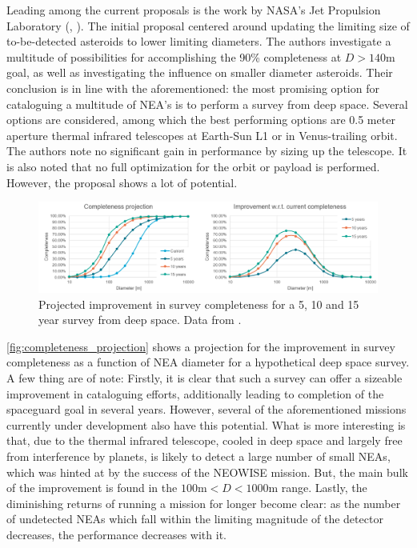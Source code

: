 Leading among the current proposals is the work by NASA's Jet Propulsion Laboratory (\cite{2003NEOSDT}, \cite{2017NEOSDT}). The initial proposal centered around updating the limiting size of to-be-detected asteroids to lower limiting diameters. The authors investigate a multitude of possibilities for accomplishing the 90\% completeness at $D > 140 \mathrm{m}$ goal, as well as investigating the influence on smaller diameter asteroids. Their conclusion is in line with the aforementioned: the most promising option for cataloguing a multitude of NEA's is to perform a survey from deep space. Several options are considered, among which the best performing options are 0.5 meter aperture thermal infrared telescopes at Earth-Sun L1 or in Venus-trailing orbit. The authors note no significant gain in performance by sizing up the telescope. It is also noted that no full optimization for the orbit or payload is performed. However, the proposal shows a lot of potential. \\

\begin{figure}[htbp]
 \centering
 \includegraphics[width=1.0\textwidth]{img/completeness_projection.png}
 \caption{Projected improvement in survey completeness for a 5, 10 and 15 year survey from deep space. Data from \cite{2017NEOSDT}.}
 \label{fig:completeness_projection}
\end{figure}

\autoref{fig:completeness_projection} shows a projection for the improvement in survey completeness as a function of NEA diameter for a hypothetical deep space survey. A few thing are of note: Firstly, it is clear that such a survey can offer a sizeable improvement in cataloguing efforts, additionally leading to completion of the spaceguard goal in several years. However, several of the aforementioned missions currently under development also have this potential. What is more interesting is that, due to the thermal infrared telescope, cooled in deep space and largely free from interference by planets, is likely to detect a large number of small NEAs, which was hinted at by the success of the NEOWISE mission. But, the main bulk of the improvement is found in the $100 \mathrm{m} < D < 1000 \mathrm{m}$ range. Lastly, the diminishing returns of running a mission for longer become clear: as the number of undetected NEAs which fall within the limiting magnitude of the detector decreases, the performance decreases with it. \\

